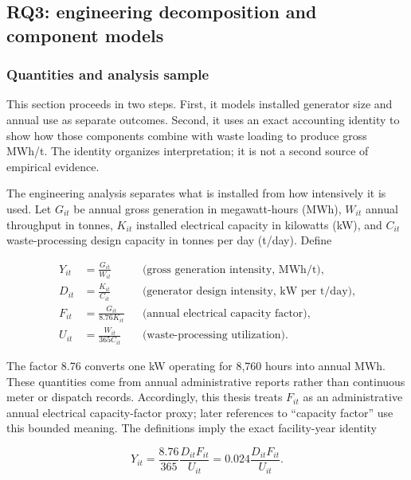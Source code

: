 \documentclass[12pt,a4paper]{article}
\begin{document}
\subsection{RQ3: engineering decomposition and component models}

\subsubsection{Quantities and analysis sample}

This section proceeds in two steps. First, it models installed generator size
and annual use as separate outcomes. Second, it uses an exact accounting
identity to show how those components combine with waste loading to produce
gross MWh/t. The identity organizes interpretation; it is not a second source
of empirical evidence.

The engineering analysis separates what is installed from how intensively it is
used. Let $G_{it}$ be annual gross generation in megawatt-hours (MWh), $W_{it}$
annual throughput in tonnes, $K_{it}$ installed electrical capacity in
kilowatts (kW), and $C_{it}$ waste-processing design capacity in tonnes per day
(t/day). Define

\begin{align}
Y_{it}&=\frac{G_{it}}{W_{it}}
&&\text{(gross generation intensity, MWh/t)},
\label{eq:gross-intensity}\\
D_{it}&=\frac{K_{it}}{C_{it}}
&&\text{(generator design intensity, kW per t/day)},
\label{eq:design-intensity}\\
F_{it}&=\frac{G_{it}}{8.76K_{it}}
&&\text{(annual electrical capacity factor)},
\label{eq:capacity-factor}\\
U_{it}&=\frac{W_{it}}{365C_{it}}
&&\text{(waste-processing utilization)}.
\label{eq:waste-utilization}
\end{align}

The factor 8.76 converts one kW operating for 8,760 hours into annual MWh. These
quantities come from annual administrative reports rather than continuous meter
or dispatch records. Accordingly, this thesis treats $F_{it}$ as an
administrative annual electrical capacity-factor proxy; later references to
``capacity factor'' use this bounded meaning. The definitions imply the exact
facility-year identity

\begin{equation}
Y_{it}=\frac{8.76}{365}\frac{D_{it}F_{it}}{U_{it}}
=0.024\frac{D_{it}F_{it}}{U_{it}}.
\label{eq:engineering-identity}
\end{equation}
\end{document}
